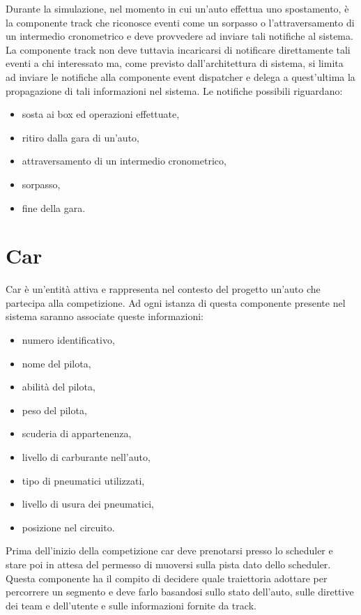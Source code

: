 \documentclass[11pt,a4paper]{report}
\begin{document}
Durante la simulazione, nel momento in cui un'auto effettua uno spostamento, è la componente track che riconosce eventi come un sorpasso o l'attraversamento di un intermedio cronometrico e deve provvedere ad inviare tali notifiche al sistema. La componente track non deve tuttavia incaricarsi di notificare direttamente tali eventi a chi interessato ma, come previsto dall'architettura di sistema, si limita ad inviare le notifiche alla componente event dispatcher e delega a quest'ultima la propagazione di tali informazioni nel sistema.
Le notifiche possibili riguardano:
\begin{itemize}
\item sosta ai box ed operazioni effettuate,
\item ritiro dalla gara di un'auto,
\item attraversamento di un intermedio cronometrico,
\item sorpasso,
\item fine della gara.
\end{itemize}

\section{Car}
Car è un'entità attiva e rappresenta nel contesto del progetto un'auto che partecipa alla competizione. Ad ogni istanza di questa componente presente nel sistema saranno associate queste informazioni:
\begin{itemize}
\item numero identificativo,
\item nome del pilota,
\item abilità del pilota,
\item peso del pilota,
\item scuderia di appartenenza,
\item livello di carburante nell'auto,
\item tipo di pneumatici utilizzati,
\item livello di usura dei pneumatici,
\item posizione nel circuito.
\end{itemize}
Prima dell'inizio della competizione car deve prenotarsi presso lo scheduler e stare poi in attesa del permesso di muoversi sulla pista dato dello scheduler.
Questa componente ha il compito di decidere quale traiettoria adottare per percorrere un segmento e deve farlo basandosi sullo stato dell'auto, sulle direttive dei team e dell'utente e sulle informazioni fornite da track.
\end{document}
